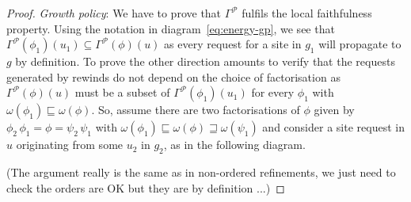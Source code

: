 \documentclass[a4paper,12pt]{article}
\newcommand{\diagram}[1]{diagram~\ref{eq:#1}}
\newcommand{\anon}[1]{\left|#1\right|}
\newcommand{\gp}{\Gamma}
\newcommand{\shapes}{\mathcal{P}}
\begin{document}
\begin{proof}
  \emph{Growth policy}:
  We have to prove that
  $\gp^\shapes$ fulfils the local faithfulness property.
  Using the notation in \diagram{energy-gp},
  we see that $\gp^\shapes(\phi_1)(u_1) \subseteq \gp^\shapes(\phi)(u)$
  as every request for a site in $g_1$ will propagate to $g$
  by definition.
  To prove the other direction
  amounts to verify that the requests generated by rewinds
  do not depend on the choice of factorisation
  as $\gp^\shapes(\phi)(u)$ must be a subset of
  $\gp^\shapes(\phi_1)(u_1)$ for every $\phi_1$
  with $\omega(\phi_1) \sqsubseteq \omega(\phi)$.
  So, assume there are two factorisations of $\phi$
  given by $\phi_2\,\phi_1 = \phi = \psi_2\,\psi_1$
  with $\omega(\phi_1) \sqsubseteq \omega(\phi)
  \sqsupseteq \omega(\psi_1)$
  and consider a site request in $u$
  originating from some $u_2$ in $g_2$,
  as in the following diagram.
  \begin{center}
  \end{center}
  (The argument really is the same as in non-ordered refinements,
  we just need to check the orders are OK
  but they are by definition ...)
\end{proof}
\end{document}
